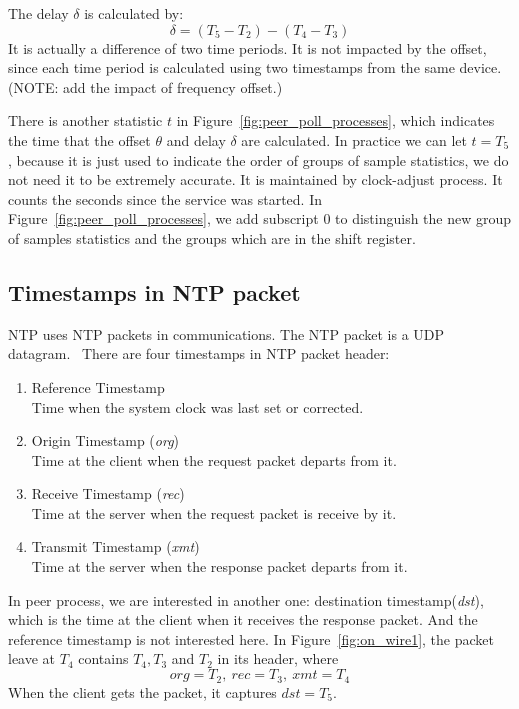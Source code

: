 The delay $\delta$ is calculated by:
\begin{equation}
    \delta = (T_5 - T_2) - (T_4 - T_3)
    \label{eq:delay_def}
\end{equation}
It is actually a difference of two time periods. It is not impacted by the
offset, since each time period is calculated using two timestamps from the same
device.
(NOTE: add the impact of frequency offset.)

There is another statistic $t$ in Figure~\ref{fig:peer_poll_processes}, which
indicates the time that the offset $\theta$ and delay $\delta$ are calculated.
In practice we can let $t = T_5$, because it is just used to indicate the order
of groups of sample statistics, we do not need it to be extremely accurate.
It is maintained by clock-adjust process. It counts the seconds since the
service was started.
In Figure~\ref{fig:peer_poll_processes}, we add subscript 0 to distinguish the
new group of samples statistics and the groups which are in the shift register.

\subsection{Timestamps in NTP packet}%
\label{sub:timestamps_in_ntp_packet}
NTP uses NTP packets in communications. The NTP packet is a UDP
datagram.~\cite{rfc5905} There are four timestamps in NTP packet header:
\begin{enumerate}
    \item Reference Timestamp\\
        Time when the system clock was last set or corrected.
    \item Origin Timestamp (\emph{org})\\
        Time at the client when the request packet departs from it.
    \item Receive Timestamp (\emph{rec})\\
        Time at the server when the request packet is receive by it.
    \item Transmit Timestamp (\emph{xmt})\\
        Time at the server when the response packet departs from it.
\end{enumerate}
In peer process, we are interested in another one: destination
timestamp(\emph{dst}), which is the time at the client when it receives the
response packet. And the reference timestamp is not interested here. In
Figure~\ref{fig:on_wire1}, the packet leave at $T_4$ contains $T_4, T_3$ and
$T_2$ in its header, where
$$ org = T_2,~rec = T_3,~xmt = T_4 $$
When the client gets the packet, it captures $dst = T_5$.

